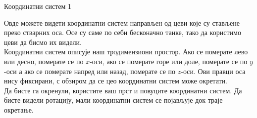 \documentclass[sr]{./../../common/SurferDesc}%
\begin{document}
\footnotesize
%


\begin{surferPage}
  \begin{surferTitle}Координатни систем 1 \end{surferTitle}
   \begin{surferText}
   
Овде можете видети координатни систем направљен од цеви које су стављене преко стварних оса. Осе су саме по себи бесконачно танке, тако да користимо цеви да бисмо их видели.\\
Координатни систем описује наш тродимензиони простор. Ако се померате лево или десно, померате се по $x$-оси, ако се померате горе или доле, померате се по $y$-оси а ако се померате напред или назад, померате се по $z$-оси. Ови правци оса нису фиксирани, с обзиром да се цео координатни систем може окретати.\\
\vspace{0.3cm}
Да бисте га окренули, користите ваш прст и повуците координатни систем. Да бисте видели ротацију, мали координатни систем се појављује док траје окретање.
     \end{surferText}
\end{surferPage}
\end{document}
